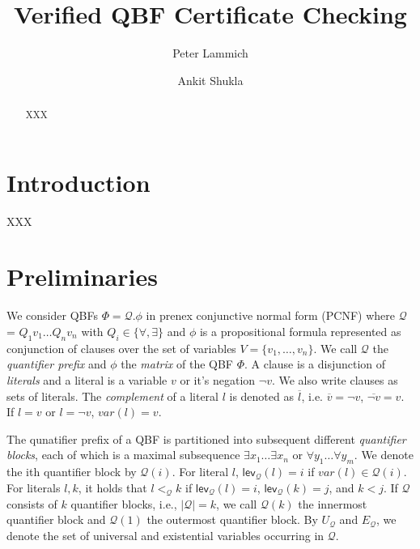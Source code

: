 \documentclass[runningheads]{llncs}
\newcommand{\var}{\mathit{var}}
\newcommand{\matrixf}{\phi}
\newcommand{\qp}{\mathcal{Q}}
\newcommand{\FFF}{\Phi}
\newcommand{\0}{0}
\newcommand{\1}{1}
\def\universals{U_\mathcal{Q}}
\def\existentials{E_\mathcal{Q}}
\def\qlvl{\mathsf{lev_\qp}}
\begin{document}

%
\title{Verified QBF Certificate Checking}


%
\author{Peter Lammich \and Ankit Shukla}

%
%
\maketitle              %
%
\begin{abstract} 
 XXX

\end{abstract}

\section{Introduction}
\label{sec:intro}

XXX

\section{Preliminaries}
\label{sec:pre}

We consider QBFs $\FFF = {\qp}.\matrixf$ in prenex conjunctive normal form (PCNF) where $\qp$ = $Q_{1} v_{1} \ldots Q_{n} v_{n}$ with $Q_{i} \in \{\forall, \exists \}$ and $\matrixf$ is a propositional formula represented as conjunction of clauses over the set of variables $V = \{v_{1}, \ldots, v_{n}\}$. We call $\qp$ the \textit{quantifier prefix} and $\matrixf$ the \textit{matrix} of the QBF $\Phi$. A clause is a disjunction of \textit{literals} and a literal is a variable $v$ or it's negation $\neg v$. We also write clauses as sets of literals. The \textit{complement} of a literal $l$ is denoted as $\overline{l}$, i.e. $\overline{v} = \neg v$, $\overline{\neg{v}} = v$. If $l = v$ or $l = \neg v$, $\var(l) = v$.

The qunatifier prefix of a QBF is partitioned into subsequent different \textit{quantifier blocks}, each of which is a maximal subsequence $\exists x_{1} \ldots \exists x_{n}$ or $\forall y_{1} \ldots \forall y_{m}$. We denote the ith quantifier block by $\qp(i)$. For literal $l$, $\qlvl(l) = i$ if $\var(l) \in \qp(i)$. For literals $l, k$, it holds that $l <_\qp k$ if $\qlvl(l) = i$, $\qlvl(k) = j$, and $k < j$. If $\qp$ consists of $k$ quantifier blocks, i.e., $|\qp| = k$,  we call $\qp({k})$ the innermost quantifier block and $\qp({1})$ the outermost quantifier block. By $\universals$ and $\existentials$, we denote the set of universal and existential variables occurring in $\qp$. 
\end{document}
